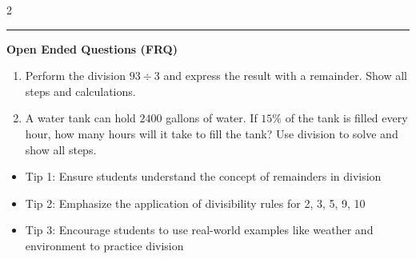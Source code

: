 \documentclass[10pt]{article}
\begin{document}
\begin{multicols}{2}
\begin{enumerate}[label=\textbf{Q\arabic*.}, leftmargin=*, itemsep=6pt, parsep=0pt]
\end{enumerate}
\end{multicols}

\vspace{-0.2cm}
\hrule
\vspace{0.2cm}
\textbf{\small Open Ended Questions (FRQ)}
\begin{enumerate}[label=\textbf{Q\arabic*.}, start=9, itemsep=5pt, topsep=0pt]

  \item \small Perform the division $93 \div 3$ and express the result with a remainder. Show all steps and calculations. \vspace{2cm}

  \item \small A water tank can hold $2400$ gallons of water. If $15\%$ of the tank is filled every hour, how many hours will it take to fill the tank? Use division to solve and show all steps. \vspace{2cm}

\end{enumerate}

\vfill

\begin{tcolorbox}[colback=blue!5, colframe=mainblue!50, title=\small \textbf{Chef's Tips}, fonttitle=\bfseries, bottom=1mm]
\begin{itemize}[noitemsep, topsep=2pt, leftmargin=0.5cm]
  \item \scriptsize Tip 1: Ensure students understand the concept of remainders in division\item \scriptsize Tip 2: Emphasize the application of divisibility rules for 2, 3, 5, 9, 10\item \scriptsize Tip 3: Encourage students to use real-world examples like weather and environment to practice division
\end{itemize}
\end{tcolorbox}
\end{document}

